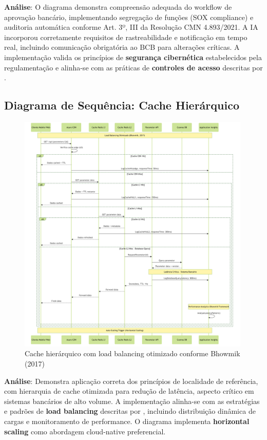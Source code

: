\textbf{Análise}: O diagrama demonstra compreensão adequada do workflow de aprovação bancário, implementando segregação de funções (SOX compliance) e auditoria automática conforme Art. 3º, III da Resolução CMN 4.893/2021. A IA incorporou corretamente requisitos de rastreabilidade e notificação em tempo real, incluindo comunicação obrigatória ao BCB para alterações críticas. A implementação valida os princípios de \textbf{segurança cibernética} estabelecidos pela regulamentação e alinha-se com as práticas de \textbf{controles de acesso} descritas por .

\subsection{Diagrama de Sequência: Cache Hierárquico}

\begin{figure}[h]
    \centering
    \includegraphics[width=0.99\textwidth]{figuras/v_006_02_cache_hierarquico.png} 
    \caption{Cache hierárquico com load balancing otimizado conforme Bhowmik (2017)}
    \label{fig:v_006_02_cache_hierarquico}
\end{figure}

\textbf{Análise}: Demonstra aplicação correta dos princípios de localidade de referência, com hierarquia de cache otimizada para redução de latência, aspecto crítico em sistemas bancários de alto volume. A implementação alinha-se com as estratégias e padrões de \textbf{load balancing} descritas por , incluindo distribuição dinâmica de cargas e monitoramento de performance. O diagrama implementa \textbf{horizontal scaling} como abordagem cloud-native preferencial.

